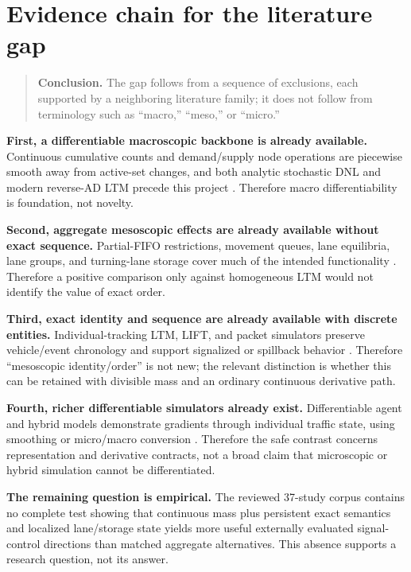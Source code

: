 \documentclass[11pt,a4paper]{article}
\newcommand{\keypoint}[1]{\begin{quote}\colorbox{bluegray}{\parbox{0.93\linewidth}{\textbf{Conclusion.} #1}}\end{quote}}
\begin{document}
\section{Evidence chain for the literature gap}

\keypoint{The gap follows from a sequence of exclusions, each supported by a neighboring literature family; it does not follow from terminology such as ``macro,'' ``meso,'' or ``micro.''}

\textbf{First, a differentiable macroscopic backbone is already available.} Continuous cumulative counts and demand/supply node operations are piecewise smooth away from active-set changes, and both analytic stochastic DNL and modern reverse-AD LTM precede this project \cite{osorio2011,seo2026}. Therefore macro differentiability is foundation, not novelty.

\textbf{Second, aggregate mesoscopic effects are already available without exact sequence.} Partial-FIFO restrictions, movement queues, lane equilibria, lane groups, and turning-lane storage cover much of the intended functionality \cite{wright2017,wei2025,gong2025,liu2011,gao2012}. Therefore a positive comparison only against homogeneous LTM would not identify the value of exact order.

\textbf{Third, exact identity and sequence are already available with discrete entities.} Individual-tracking LTM, LIFT, and packet simulators preserve vehicle/event chronology and support signalized or spillback behavior \cite{desouza2025,nietal2026,digangi2016}. Therefore ``mesoscopic identity/order'' is not new; the relevant distinction is whether this can be retained with divisible mass and an ordinary continuous derivative path.

\textbf{Fourth, richer differentiable simulators already exist.} Differentiable agent and hybrid models demonstrate gradients through individual traffic state, using smoothing or micro/macro conversion \cite{andelfinger2021,son2022}. Therefore the safe contrast concerns representation and derivative contracts, not a broad claim that microscopic or hybrid simulation cannot be differentiated.

\textbf{The remaining question is empirical.} The reviewed 37-study corpus contains no complete test showing that continuous mass plus persistent exact semantics and localized lane/storage state yields more useful externally evaluated signal-control directions than matched aggregate alternatives. This absence supports a research question, not its answer.
\end{document}
